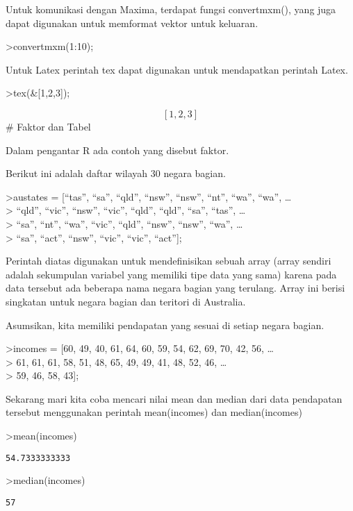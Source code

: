 \documentclass[
]{book}
\begin{document}
Untuk komunikasi dengan Maxima, terdapat fungsi convertmxm(), yang juga dapat digunakan untuk memformat vektor untuk keluaran.

\textgreater convertmxm(1:10);

Untuk Latex perintah tex dapat digunakan untuk mendapatkan perintah Latex.

\textgreater tex(\&{[}1,2,3{]});

\[\left[ 1 , 2 , 3 \right]\] \# Faktor dan Tabel

Dalam pengantar R ada contoh yang disebut faktor.

Berikut ini adalah daftar wilayah 30 negara bagian.

\textgreater austates = {[}``tas'', ``sa'', ``qld'', ``nsw'', ``nsw'', ``nt'', ``wa'', ``wa'', \ldots{}\\
\textgreater{} ``qld'', ``vic'', ``nsw'', ``vic'', ``qld'', ``qld'', ``sa'', ``tas'', \ldots{}\\
\textgreater{} ``sa'', ``nt'', ``wa'', ``vic'', ``qld'', ``nsw'', ``nsw'', ``wa'', \ldots{}\\
\textgreater{} ``sa'', ``act'', ``nsw'', ``vic'', ``vic'', ``act''{]};

Perintah diatas digunakan untuk mendefinisikan sebuah array (array sendiri adalah sekumpulan variabel yang memiliki tipe data yang sama) karena pada data tersebut ada beberapa nama negara bagian yang terulang. Array ini berisi singkatan untuk negara bagian dan teritori di Australia.

Asumsikan, kita memiliki pendapatan yang sesuai di setiap negara bagian.

\textgreater incomes = {[}60, 49, 40, 61, 64, 60, 59, 54, 62, 69, 70, 42, 56, \ldots{}\\
\textgreater{} 61, 61, 61, 58, 51, 48, 65, 49, 49, 41, 48, 52, 46, \ldots{}\\
\textgreater{} 59, 46, 58, 43{]};

Sekarang mari kita coba mencari nilai mean dan median dari data pendapatan tersebut menggunakan perintah mean(incomes) dan median(incomes)

\textgreater mean(incomes)

\begin{verbatim}
54.7333333333
\end{verbatim}

\textgreater median(incomes)

\begin{verbatim}
57
\end{verbatim}
\end{document}
